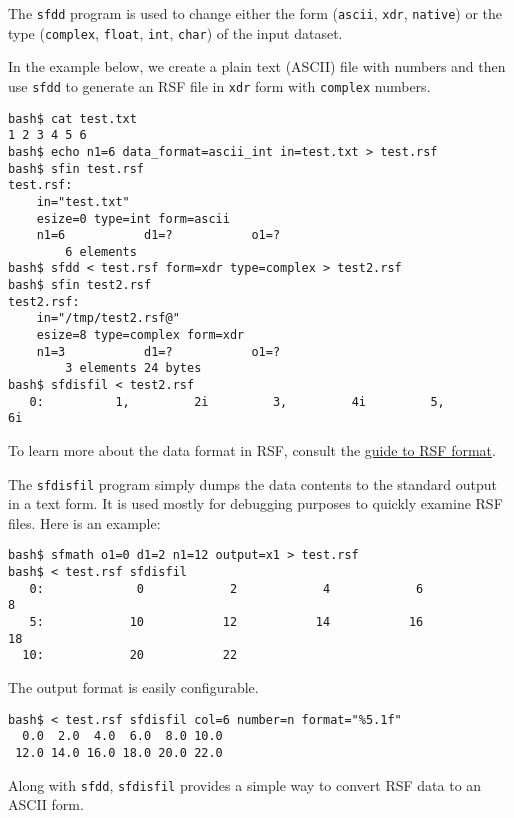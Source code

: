 \noindent\doublebox{\parbox{\textwidth}{

}}

The \texttt{sfdd} program is used to change either the form (\texttt{ascii},
\texttt{xdr}, \texttt{native}) or the type (\texttt{complex}, \texttt{float},
\texttt{int}, \texttt{char}) of the input dataset. 

In the example below, we create a plain text (ASCII) file with numbers and
then use \texttt{sfdd} to generate an RSF file in \texttt{xdr} form with
\texttt{complex} numbers. 
\begin{verbatim}
bash$ cat test.txt
1 2 3 4 5 6
bash$ echo n1=6 data_format=ascii_int in=test.txt > test.rsf
bash$ sfin test.rsf
test.rsf:
    in="test.txt"
    esize=0 type=int form=ascii
    n1=6           d1=?           o1=?
        6 elements
bash$ sfdd < test.rsf form=xdr type=complex > test2.rsf
bash$ sfin test2.rsf
test2.rsf:
    in="/tmp/test2.rsf@"
    esize=8 type=complex form=xdr
    n1=3           d1=?           o1=?
        3 elements 24 bytes
bash$ sfdisfil < test2.rsf
   0:          1,         2i         3,         4i         5,         6i
\end{verbatim}

To learn more about the data format in RSF, consult the
\href{http://egl.beg.utexas.edu/RSF/book/rsf/rsf/format_html/}{guide to RSF
  format}.

\noindent\doublebox{\parbox{\textwidth}{

}}

The \texttt{sfdisfil} program simply dumps the data contents to the standard
output in a text form. It is used mostly for debugging purposes to quickly
examine RSF files. Here is an example:
\begin{verbatim}
bash$ sfmath o1=0 d1=2 n1=12 output=x1 > test.rsf
bash$ < test.rsf sfdisfil
   0:             0            2            4            6            8
   5:            10           12           14           16           18
  10:            20           22
\end{verbatim}
The output format is easily configurable.
\begin{verbatim}
bash$ < test.rsf sfdisfil col=6 number=n format="%5.1f"
  0.0  2.0  4.0  6.0  8.0 10.0
 12.0 14.0 16.0 18.0 20.0 22.0
\end{verbatim}
Along with \texttt{sfdd}, \texttt{sfdisfil} provides a simple way to convert
RSF data to an ASCII form.

\noindent\doublebox{\parbox{\textwidth}{
    
}}

